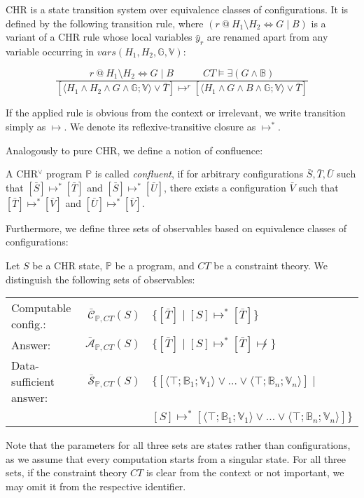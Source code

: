 \documentclass[acmtocl]{acmtrans2m}
\newcommand\state[1]{\langle #1 \rangle}
\newcommand{\oesqv}{\ensuremath{\omega^\vee_e}}
\newcommand{\bbP}{\ensuremath{\mathbb{P}}}
\newcommand{\B}{\ensuremath{\mathbb{B}}}
\newcommand{\V}{\ensuremath{\mathbb{V}}}
\newcommand{\G}{\ensuremath{\mathbb{G}}}
\newcommand{\bcA}{\ensuremath{\bar{\mathcal{A}}}}
\newcommand{\bcS}{\ensuremath{\bar{\mathcal{S}}}}
\newcommand{\bcC}{\ensuremath{\bar{\mathcal{C}}}}
\newcommand{\bS}{\bar{S}}
\newcommand{\bT}{\bar{T}}
\newcommand{\bU}{\bar{U}}
\newcommand{\bV}{\bar{V}}
\newcommand{\by}{\bar{y}}
\newcommand{\der}{\ensuremath{\mapsto}}
\begin{document}
\begin{definition}[Transition System of $\oesqv$]
\label{def:vee-tr-system}
CHR is a state transition system over equivalence classes of configurations. It
is defined by the following transition rule, where $(r\ @\ H_1 \setminus H_2
\Leftrightarrow G\mid B)$ is a variant of a CHR rule whose local variables
$\by_r$ are renamed apart from any variable occurring in $vars(H_1,H_2,\G,\V)$:

\medskip
\[
\frac{
	r\ @\ H_1 \setminus H_2 \Leftrightarrow G\mid B
		\quad\quad\quad
	CT\models \exists(G\wedge\B)
}
{
	[\state{H_1 \wedge H_2 \wedge G\wedge\G;\V}\vee\bT]
		\der^r
	[\state{H_1 \wedge G\wedge B\wedge \G;\V}\vee\bT]
}
\]

\medskip
If the applied rule is obvious from the context or irrelevant, we write
transition simply as $\mapsto$. We denote its reflexive-transitive closure
as $\mapsto^{*}$.
\end{definition}

Analogously to pure CHR, we define a notion of confluence:

\begin{definition}[Confluence]
\label{def:vee-confluence}
A CHR$^\vee$ program $\bbP$ is called \emph{confluent}, if for arbitrary
configurations $\bS,\bT,\bU$ such that $[\bS]\mapsto^{*}[\bT]$ and
$[\bS]\mapsto^{*}[\bU]$, there exists a configuration $\bV$ such that
$[\bT]\mapsto^{*}[\bV]$ and $[\bU]\mapsto^{*}[\bV]$.
\end{definition}

Furthermore, we define three sets of observables based on equivalence classes of
configurations:

\begin{definition}[Observables]
	\label{def:observables-vee}
Let $S$ be a CHR state, $\bbP$ be a program, and $CT$ be a constraint theory. We
distinguish the following sets of observables:

\medskip
\begin{tabular}{l @{\,} r @{\,$::=$} l}
Computable config.: &
	$\bcC_{\bbP,CT}(S)$ &
		$\{[\bT]\mid [S]\mapsto^*[\bT]\}$\\
Answer: &
	$\bcA_{\bbP,CT}(S)$ &
		$\{[\bT]\mid [S]\mapsto^*[\bT]\not\mapsto\}$\\
Data-sufficient answer: &
	$\bcS_{\bbP,CT}(S)$ &
		$\{[\state{\top;\B_1;\V_1}\vee\ldots\vee\state{\top;\B_n;\V_n}]\mid$ \\
\multicolumn{2}{c}{} & \quad
		$[S]\mapsto^*[\state{\top;\B_1;\V_1}\vee\ldots\vee\state{\top;\B_n;\V_n}]\}$
\end{tabular}

\medskip
Note that the parameters for all three sets are states rather than
configurations, as we assume that every computation starts from a singular
state. For all three sets, if the constraint theory $CT$ is clear from the
context or not important, we may omit it from the respective identifier.
\end{definition}
\end{document}
